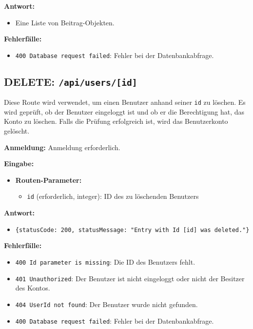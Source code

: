 \documentclass[a4paper,12pt]{article}
\begin{document}
\textbf{Antwort:}
\begin{itemize}
    \item Eine Liste von Beitrag-Objekten.
\end{itemize}

\textbf{Fehlerfälle:}
\begin{itemize}
    \item \texttt{400 Database request failed}: Fehler bei der Datenbankabfrage.
\end{itemize}

\subsection{DELETE: \texttt{/api/users/[id]}}

Diese Route wird verwendet, um einen Benutzer anhand seiner \texttt{id} zu löschen. Es wird geprüft, ob der Benutzer eingeloggt ist und ob er die Berechtigung hat, das Konto zu löschen. Falls die Prüfung erfolgreich ist, wird das Benutzerkonto gelöscht.

\textbf{Anmeldung:} Anmeldung erforderlich.

\textbf{Eingabe:}
\begin{itemize}
    \item \textbf{Routen-Parameter:}
    \begin{itemize}
        \item \texttt{id} (erforderlich, integer): ID des zu löschenden Benutzers
    \end{itemize}
\end{itemize}

\textbf{Antwort:}
\begin{itemize}
    \item \texttt{\{statusCode: 200, statusMessage: "Entry with Id [id] was deleted."\}}
\end{itemize}

\textbf{Fehlerfälle:}
\begin{itemize}
    \item \texttt{400 Id parameter is missing}: Die ID des Benutzers fehlt.
    \item \texttt{401 Unauthorized}: Der Benutzer ist nicht eingeloggt oder nicht der Besitzer des Kontos.
    \item \texttt{404 UserId not found}: Der Benutzer wurde nicht gefunden.
    \item \texttt{400 Database request failed}: Fehler bei der Datenbankabfrage.
\end{itemize}
\end{document}
